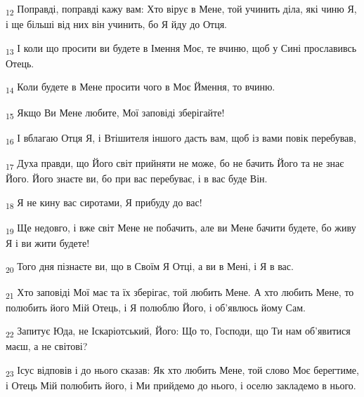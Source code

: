 \begin{tcolorbox}
\textsubscript{12} Поправді, поправді кажу вам: Хто вірує в Мене, той учинить діла, які чиню Я, і ще більші від них він учинить, бо Я йду до Отця.
\end{tcolorbox}
\begin{tcolorbox}
\textsubscript{13} І коли що просити ви будете в Імення Моє, те вчиню, щоб у Сині прославивсь Отець.
\end{tcolorbox}
\begin{tcolorbox}
\textsubscript{14} Коли будете в Мене просити чого в Моє Ймення, то вчиню.
\end{tcolorbox}
\begin{tcolorbox}
\textsubscript{15} Якщо Ви Мене любите, Мої заповіді зберігайте!
\end{tcolorbox}
\begin{tcolorbox}
\textsubscript{16} І вблагаю Отця Я, і Втішителя іншого дасть вам, щоб із вами повік перебував,
\end{tcolorbox}
\begin{tcolorbox}
\textsubscript{17} Духа правди, що Його світ прийняти не може, бо не бачить Його та не знає Його. Його знаєте ви, бо при вас перебуває, і в вас буде Він.
\end{tcolorbox}
\begin{tcolorbox}
\textsubscript{18} Я не кину вас сиротами, Я прибуду до вас!
\end{tcolorbox}
\begin{tcolorbox}
\textsubscript{19} Ще недовго, і вже світ Мене не побачить, але ви Мене бачити будете, бо живу Я і ви жити будете!
\end{tcolorbox}
\begin{tcolorbox}
\textsubscript{20} Того дня пізнаєте ви, що в Своїм Я Отці, а ви в Мені, і Я в вас.
\end{tcolorbox}
\begin{tcolorbox}
\textsubscript{21} Хто заповіді Мої має та їх зберігає, той любить Мене. А хто любить Мене, то полюбить його Мій Отець, і Я полюблю Його, і об'явлюсь йому Сам.
\end{tcolorbox}
\begin{tcolorbox}
\textsubscript{22} Запитує Юда, не Іскаріотський, Його: Що то, Господи, що Ти нам об'явитися маєш, а не світові?
\end{tcolorbox}
\begin{tcolorbox}
\textsubscript{23} Ісус відповів і до нього сказав: Як хто любить Мене, той слово Моє берегтиме, і Отець Мій полюбить його, і Ми прийдемо до нього, і оселю закладемо в нього.
\end{tcolorbox}
